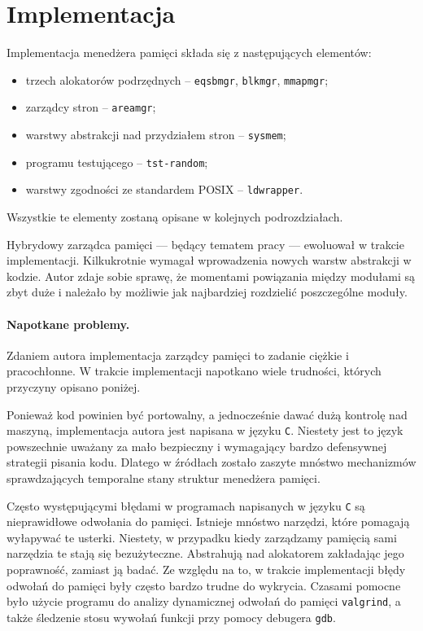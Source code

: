 \documentclass[12pt,a4paper,titlepage,twoside]{mwart}
\begin{document}
\newpage


\section{Implementacja}
\hypertarget{Implementacja}{}

Implementacja menedżera pamięci składa się z następujących elementów:
\begin{itemize}
\item trzech alokatorów podrzędnych -- \verb+eqsbmgr+, \verb+blkmgr+, \verb+mmapmgr+;
\item zarządcy stron -- \verb+areamgr+;
\item warstwy abstrakcji nad przydziałem stron -- \verb+sysmem+;
\item programu testującego -- \verb+tst-random+;
\item warstwy zgodności ze standardem POSIX -- \verb+ldwrapper+.
\end{itemize}
Wszystkie te elementy zostaną opisane w kolejnych podrozdziałach.

\vspace{1ex}

Hybrydowy zarządca pamięci --- będący tematem pracy --- ewoluował w trakcie
implementacji.  Kilkukrotnie wymagał wprowadzenia nowych warstw abstrakcji w
kodzie. Autor zdaje sobie sprawę, że momentami powiązania między modułami są
zbyt duże i należało by możliwie jak najbardziej rozdzielić poszczególne
moduły.

\paragraph{Napotkane problemy.} Zdaniem autora implementacja zarządcy pamięci
to zadanie ciężkie i pracochłonne. W trakcie implementacji napotkano wiele
trudności, których przyczyny opisano poniżej.

Ponieważ kod powinien być portowalny, a jednocześnie dawać dużą
kontrolę nad maszyną, implementacja autora jest napisana w języku \verb+C+.
Niestety jest to język powszechnie uważany za mało bezpieczny i wymagający
bardzo defensywnej strategii pisania kodu. Dlatego w źródłach zostało
zaszyte mnóstwo mechanizmów sprawdzających temporalne stany struktur
menedżera pamięci.
	
Często występującymi błędami w programach napisanych w języku \verb+C+ są
nieprawidłowe odwołania do pamięci. Istnieje mnóstwo narzędzi, które pomagają
wyłapywać te usterki. Niestety, w przypadku kiedy zarządzamy pamięcią sami
narzędzia te stają się bezużyteczne. Abstrahują nad alokatorem zakładając jego
poprawność, zamiast ją badać. Ze względu na to, w trakcie implementacji błędy
odwołań do pamięci były często bardzo trudne do wykrycia. Czasami pomocne było
użycie programu do analizy dynamicznej odwołań do pamięci \verb+valgrind+, a
także śledzenie stosu wywołań funkcji przy pomocy debugera \verb+gdb+.
\end{document}
